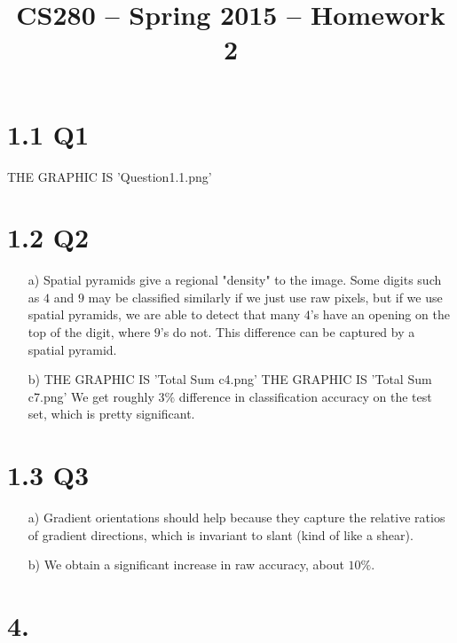 \documentclass[11pt]{article}
\title{CS280 -- Spring 2015 -- Homework 2}
\author{\Name}
\begin{document}
\maketitle

\section*{1.1 Q1}
THE GRAPHIC IS 'Question1.1.png'
\newpage
\section*{1.2 Q2}
\begin{itemize}
\item[a)]
Spatial pyramids give a regional "density" to the image. Some digits such as $4$ and $9$ may be classified similarly if we just use raw pixels, but if we use spatial pyramids, we are able to detect that many $4$'s have an opening on the top of the digit, where $9$'s do not. This difference can be captured by a spatial pyramid.
\item[b)]
THE GRAPHIC IS 'Total Sum c4.png'
THE GRAPHIC IS 'Total Sum c7.png'
We get roughly $3\%$ difference in classification accuracy on the test set, which is pretty significant. 
\end{itemize}
\newpage


\newpage
\section*{1.3 Q3}	
\begin{itemize}
\item[a)]
Gradient orientations should help because they capture the relative ratios of gradient directions, which is invariant to slant (kind of like a shear).
\item[b)]
We obtain a significant increase in raw accuracy, about $10\%$.
\end{itemize}
\newpage
\section*{4.}
\end{document}
